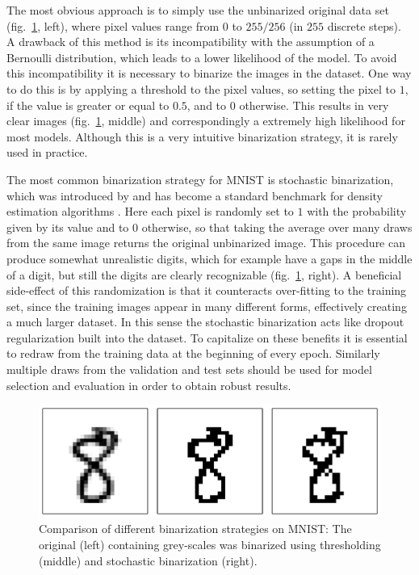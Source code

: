 The most obvious approach is to simply use the unbinarized original data set (fig.~\ref{fig:MNISTBinarizationComparison}, left), where pixel values range from $0$ to $255/256$ (in $255$ discrete steps). A drawback of this method is its incompatibility with the assumption of a Bernoulli distribution, which leads to a lower likelihood of the model.
To avoid this incompatibility it is necessary to binarize the images in the dataset. One way to do this is by applying a threshold to the pixel values, so setting the pixel to $1$, if the value is greater or equal to $0.5$, and to $0$ otherwise. This results in very clear images (fig.~\ref{fig:MNISTBinarizationComparison}, middle) and correspondingly a extremely high likelihood for most models. Although this is a very intuitive binarization strategy, it is rarely used in practice.

The most common binarization strategy for MNIST is stochastic binarization, which was introduced by \parencite{Salakhutdinov2008} and has become a standard benchmark for density estimation algorithms \parencite{Salimans2014,Rezende2014}. Here each pixel is randomly set to $1$ with the probability given by its value and to $0$ otherwise, so that taking the average over many draws from the same image returns the original unbinarized image. This procedure can produce somewhat unrealistic digits, which for example have a gaps in the middle of a digit, but still the digits are clearly recognizable (fig.~\ref{fig:MNISTBinarizationComparison}, right). A beneficial side-effect of this randomization is that it counteracts over-fitting to the training set, since the training images appear in many different forms, effectively creating a much larger dataset. In this sense the stochastic binarization acts like dropout regularization \parencite{Hinton2012} built into the dataset. To capitalize on these benefits it is essential to redraw from the training data at the beginning of every epoch. Similarly multiple draws from the validation and test sets should be used for model selection and evaluation in order to obtain robust results. 

\begin{figure}
\centering
\includegraphics[width=\columnwidth]{figures/binarization_example.pdf}
\caption{Comparison of different binarization strategies on MNIST: The original (left) containing grey-scales was binarized using thresholding (middle) and stochastic binarization (right).}
\label{fig:MNISTBinarizationComparison}
\end{figure}

